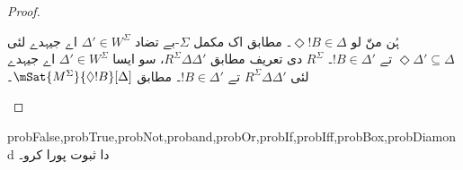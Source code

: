 \documentclass[../../../include/open-logic-section]{subfiles}
\begin{document}
\begin{proof}
\begin{enumerate}
{{{          ہُن منّ لو $\Diamond !B \in \Delta$۔
           مطابق اک مکمل
          $\Sigma$-بے تضاد $\Delta' \in W^\Sigma$ اے جیہدے لئی
          $\Diamond \Delta' \subseteq \Delta$ تے $!B \in
          \Delta'$۔ 
          $R^\Sigma$ دی تعریف مطابق $R^\Sigma \Delta\Delta'$، سو
          ایسا $\Delta' \in W^\Sigma$ اے جیہدے لئی $R^\Sigma
          \Delta\Delta'$ تے $!B \in \Delta'$۔  مطابق $\mSat{M^\Sigma}{\Diamond
            !B}[\Delta]$۔}}}{}
  \end{enumerate}
\end{proof}

\begin{probtag}{probFalse,probTrue,probNot,proband,probOr,probIf,probIff,probBox,probDiamond}
   دا ثبوت پورا کرو۔
\end{probtag}
\end{document}
